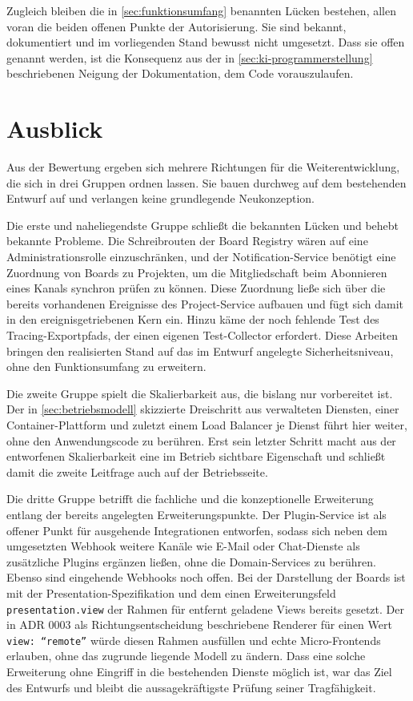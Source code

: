 Zugleich bleiben die in \vref{sec:funktionsumfang} benannten Lücken bestehen, allen voran die beiden offenen Punkte der Autorisierung. Sie sind bekannt, dokumentiert und im vorliegenden Stand bewusst nicht umgesetzt. Dass sie offen genannt werden, ist die Konsequenz aus der in \vref{sec:ki-programmerstellung} beschriebenen Neigung der Dokumentation, dem Code vorauszulaufen.

\section{Ausblick}
\label{sec:ausblick}

Aus der Bewertung ergeben sich mehrere Richtungen für die Weiterentwicklung, die sich in drei Gruppen ordnen lassen. Sie bauen durchweg auf dem bestehenden Entwurf auf und verlangen keine grundlegende Neukonzeption.

Die erste und naheliegendste Gruppe schließt die bekannten Lücken und behebt bekannte Probleme. Die Schreibrouten der Board Registry wären auf eine Administrationsrolle einzuschränken, und der Notification-Service benötigt eine Zuordnung von Boards zu Projekten, um die Mitgliedschaft beim Abonnieren eines Kanals synchron prüfen zu können. Diese Zuordnung ließe sich über die bereits vorhandenen Ereignisse des Project-Service aufbauen und fügt sich damit in den ereignisgetriebenen Kern ein. Hinzu käme der noch fehlende Test des Tracing-Exportpfads, der einen eigenen Test-Collector erfordert. Diese Arbeiten bringen den realisierten Stand auf das im Entwurf angelegte Sicherheitsniveau, ohne den Funktionsumfang zu erweitern.

Die zweite Gruppe spielt die Skalierbarkeit aus, die bislang nur vorbereitet ist. Der in \vref{sec:betriebsmodell} skizzierte Dreischritt aus verwalteten Diensten, einer Container-Plattform und zuletzt einem Load Balancer je Dienst führt hier weiter, ohne den Anwendungscode zu berühren. Erst sein letzter Schritt macht aus der entworfenen Skalierbarkeit eine im Betrieb sichtbare Eigenschaft und schließt damit die zweite Leitfrage auch auf der Betriebsseite.

Die dritte Gruppe betrifft die fachliche und die konzeptionelle Erweiterung entlang der bereits angelegten Erweiterungspunkte. Der Plugin-Service ist als offener Punkt für ausgehende Integrationen entworfen, sodass sich neben dem umgesetzten Webhook weitere Kanäle wie E-Mail oder Chat-Dienste als zusätzliche Plugins ergänzen ließen, ohne die Domain-Services zu berühren. Ebenso sind eingehende Webhooks noch offen. Bei der Darstellung der Boards ist mit der Presentation-Spezifikation und dem einen Erweiterungsfeld \texttt{presentation.view} der Rahmen für entfernt geladene Views bereits gesetzt. Der in ADR 0003 als Richtungsentscheidung beschriebene Renderer für einen Wert \texttt{view:\,\enquote{remote}} würde diesen Rahmen ausfüllen und echte Micro-Frontends erlauben, ohne das zugrunde liegende Modell zu ändern. Dass eine solche Erweiterung ohne Eingriff in die bestehenden Dienste möglich ist, war das Ziel des Entwurfs und bleibt die aussagekräftigste Prüfung seiner Tragfähigkeit.

